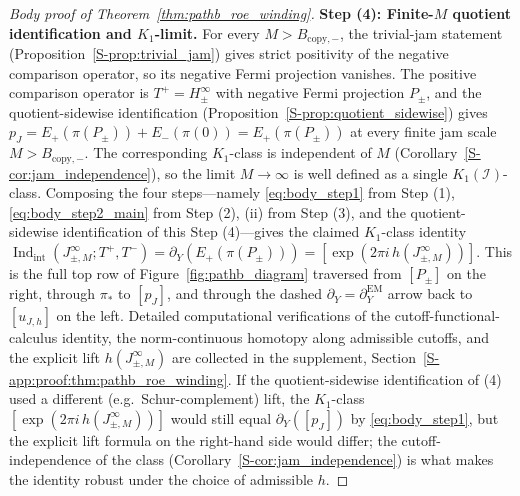\documentclass[11pt]{article}
\numberwithin{equation}{section}
\theoremstyle{definition}
\theoremstyle{remark}
\newcommand{\Indint}{\operatorname{Ind}_{\mathrm{int}}}
\begin{document}
\begin{proof}[Body proof of Theorem~\ref{thm:pathb_roe_winding}]
\medskip\noindent\textbf{Step (4): Finite-\(M\) quotient identification and \(K_1\)-limit.}
For every \(M>B_{\mathrm{copy},-}\), the trivial-jam statement
(Proposition~\ref{S-prop:trivial_jam}) gives strict positivity of the negative comparison operator,
so its negative Fermi projection vanishes. The positive comparison operator is
\(T^+=H_\pm^\infty\) with negative Fermi projection \(P_\pm\), and the quotient-sidewise
identification (Proposition~\ref{S-prop:quotient_sidewise}) gives
\(p_J=E_+(\pi(P_\pm))+E_-(\pi(0))=E_+(\pi(P_\pm))\) at every finite jam scale
\(M>B_{\mathrm{copy},-}\). The corresponding \(K_1\)-class is independent of \(M\)
(Corollary~\ref{S-cor:jam_independence}), so the limit \(M\to\infty\) is well defined as a
single \(K_1(\mathcal I)\)-class. Composing the four steps---namely
\eqref{eq:body_step1} from Step (1), \eqref{eq:body_step2_main} from Step (2),
(ii) from Step (3), and the quotient-sidewise identification of this
Step (4)---gives the claimed \(K_1\)-class identity
\(\Indint(J_{\pm,M}^\infty;T^+,T^-)=\partial_Y(E_+(\pi(P_\pm)))
=[\exp(2\pi i\,h(J_{\pm,M}^\infty))]\). This is the full top row of
Figure~\ref{fig:pathb_diagram} traversed from
\([P_\pm]\) on the right, through \(\pi_*\) to \([p_J]\), and through the dashed
\(\partial_Y=\partial^{\mathrm{EM}}_Y\) arrow back to \([u_{J,h}]\) on the left. Detailed
computational verifications of the cutoff-functional-calculus identity, the norm-continuous
homotopy along admissible cutoffs, and the explicit lift \(h(J_{\pm,M}^\infty)\) are
collected in the supplement, Section~\ref{S-app:proof:thm:pathb_roe_winding}. If the
quotient-sidewise identification of (4) used a different (e.g.\ Schur-complement) lift, the
\(K_1\)-class \([\exp(2\pi i\,h(J_{\pm,M}^\infty))]\) would still equal
\(\partial_Y([p_J])\) by \eqref{eq:body_step1}, but the explicit lift formula on the
right-hand side would differ; the cutoff-independence of the class
(Corollary~\ref{S-cor:jam_independence}) is what makes the identity robust under the choice
of admissible \(h\).
\end{proof}
\end{document}
